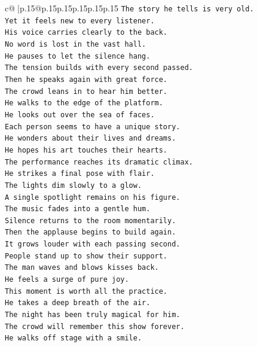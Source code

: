 \documentclass{article}
\begin{document}
{\begin{supertabular}{c@{$\;$}|p{.15\linewidth}@{}p{.15\linewidth}p{.15\linewidth}p{.15\linewidth}p{.15\linewidth}p{.15\linewidth}}
{{{\texttt{The story he tells is very old.} \\
\texttt{Yet it feels new to every listener.} \\
\texttt{His voice carries clearly to the back.} \\
\texttt{No word is lost in the vast hall.} \\
\texttt{He pauses to let the silence hang.} \\
\texttt{The tension builds with every second passed.} \\
\texttt{Then he speaks again with great force.} \\
\texttt{The crowd leans in to hear him better.} \\
\texttt{He walks to the edge of the platform.} \\
\texttt{He looks out over the sea of faces.} \\
\texttt{Each person seems to have a unique story.} \\
\texttt{He wonders about their lives and dreams.} \\
\texttt{He hopes his art touches their hearts.} \\
\texttt{The performance reaches its dramatic climax.} \\
\texttt{He strikes a final pose with flair.} \\
\texttt{The lights dim slowly to a glow.} \\
\texttt{A single spotlight remains on his figure.} \\
\texttt{The music fades into a gentle hum.} \\
\texttt{Silence returns to the room momentarily.} \\
\texttt{Then the applause begins to build again.} \\
\texttt{It grows louder with each passing second.} \\
\texttt{People stand up to show their support.} \\
\texttt{The man waves and blows kisses back.} \\
\texttt{He feels a surge of pure joy.} \\
\texttt{This moment is worth all the practice.} \\
\texttt{He takes a deep breath of the air.} \\
\texttt{The night has been truly magical for him.} \\
\texttt{The crowd will remember this show forever.} \\
\texttt{He walks off stage with a smile.} \\
}}}
\end{supertabular}}
\end{document}
